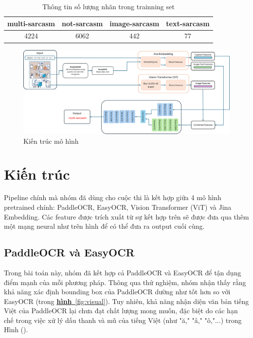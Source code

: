 \documentclass[11pt]{article}
\begin{document}
\begin{table}[h!]
\centering

\small\begin{tabular}{|cccc|}
\hline
\textbf{multi-sarcasm}  & \textbf{not-sarcasm} & \textbf{image-sarcasm} & \textbf{text-sarcasm}\\ \hline
4224 & 6062 & 442 & 77\\
\hline
\end{tabular}
\caption{Thông tin số lượng nhãn trong trainning set}
\label{table:dataset-train}
\end{table}



\begin{figure}[t]
\centering
\includegraphics[width=1.0\linewidth]{Picture1.png}
\caption{Kiến trúc mô hình}
\label{fig:example}
\end{figure}

\FloatBarrier %
\section{Kiến trúc}
\hspace*{5mm} Pipeline chính mà nhóm đã dùng cho cuộc thi là kết hợp giữa 4 mô hình pretrained chính: PaddleOCR\cite{paddleocr2020}, EasyOCR\cite{easyocr}, Vision Transformer (ViT)\cite{vit1, vit2} và  Jina Embedding\cite{jinai}. Các feature được trích xuất từ sự kết hợp trên sẽ được đưa qua thêm một mạng neural như trên hình để có thể đưa ra output cuối cùng.
\subsection{PaddleOCR và EasyOCR}
\hspace*{5mm} Trong bài toán này, nhóm đã kết hợp cả PaddleOCR và EasyOCR để tận dụng điểm mạnh của mỗi phương pháp. Thông qua thử nghiệm, nhóm nhận thấy rằng khả năng xác định bounding box của PaddleOCR dường như tốt hơn so với EasyOCR (trong \hyperref[fig:visual]{\textbf{hình}~\ref*{fig:visual}}). Tuy nhiên, khả năng nhận diện văn bản tiếng Việt của PaddleOCR lại chưa đạt chất lượng mong muốn, đặc biệt do các hạn chế trong việc xử lý dấu thanh và mũ của tiếng Việt (như "ă," "â," "ô,"...) trong Hình ().
\end{document}
